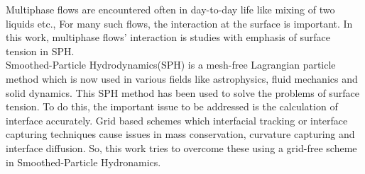 \begin{Abstract}

Multiphase flows are encountered often in day-to-day life like mixing of two liquids etc., For many such flows, the interaction at the surface is important. In this work, multiphase flows' interaction is studies with emphasis of surface tension in SPH.\\

Smoothed-Particle Hydrodynamics(SPH) is a mesh-free Lagrangian particle method which is now used in various fields like astrophysics, fluid mechanics and solid dynamics. This SPH method has been used to solve the problems of surface tension. To do this, the important issue to be addressed is the calculation of interface accurately. Grid based schemes which interfacial tracking or interface capturing techniques cause issues in mass conservation, curvature capturing and interface diffusion. So, this work tries to overcome these using a grid-free scheme in Smoothed-Particle Hydronamics.

%
%
%
%
%
\end{Abstract}

